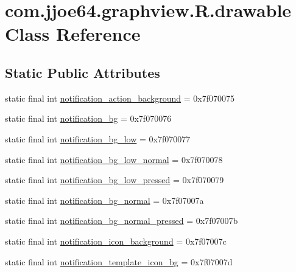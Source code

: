 \hypertarget{classcom_1_1jjoe64_1_1graphview_1_1_r_1_1drawable}{}\section{com.\+jjoe64.\+graphview.\+R.\+drawable Class Reference}
\label{classcom_1_1jjoe64_1_1graphview_1_1_r_1_1drawable}
\subsection*{Static Public Attributes}
\begin{DoxyCompactItemize}
\item 
static final int \mbox{\hyperlink{classcom_1_1jjoe64_1_1graphview_1_1_r_1_1drawable_af8199d37c7ea75d09c276d13c219ae7a}{notification\+\_\+action\+\_\+background}} = 0x7f070075
\item 
static final int \mbox{\hyperlink{classcom_1_1jjoe64_1_1graphview_1_1_r_1_1drawable_ada0acc5e3a53f1f6bdde7aa9d59bc451}{notification\+\_\+bg}} = 0x7f070076
\item 
static final int \mbox{\hyperlink{classcom_1_1jjoe64_1_1graphview_1_1_r_1_1drawable_a916fa2f370738eb94008c4a266997e1a}{notification\+\_\+bg\+\_\+low}} = 0x7f070077
\item 
static final int \mbox{\hyperlink{classcom_1_1jjoe64_1_1graphview_1_1_r_1_1drawable_a1504320877e9a7858fada6a8e3130fba}{notification\+\_\+bg\+\_\+low\+\_\+normal}} = 0x7f070078
\item 
static final int \mbox{\hyperlink{classcom_1_1jjoe64_1_1graphview_1_1_r_1_1drawable_afc7366cd118beba2c2baead9c152e41e}{notification\+\_\+bg\+\_\+low\+\_\+pressed}} = 0x7f070079
\item 
static final int \mbox{\hyperlink{classcom_1_1jjoe64_1_1graphview_1_1_r_1_1drawable_a7b82e573b747d30d6f9344e2f2dc237a}{notification\+\_\+bg\+\_\+normal}} = 0x7f07007a
\item 
static final int \mbox{\hyperlink{classcom_1_1jjoe64_1_1graphview_1_1_r_1_1drawable_a7e9e7ae4eed385d7ac57064ca2d0ce57}{notification\+\_\+bg\+\_\+normal\+\_\+pressed}} = 0x7f07007b
\item 
static final int \mbox{\hyperlink{classcom_1_1jjoe64_1_1graphview_1_1_r_1_1drawable_a42122aa6003d559deaad0c6bd2658b08}{notification\+\_\+icon\+\_\+background}} = 0x7f07007c
\item 
static final int \mbox{\hyperlink{classcom_1_1jjoe64_1_1graphview_1_1_r_1_1drawable_a07b5b1219cb4d79918c32d2de0d7ff61}{notification\+\_\+template\+\_\+icon\+\_\+bg}} = 0x7f07007d

\end{DoxyCompactItemize}
